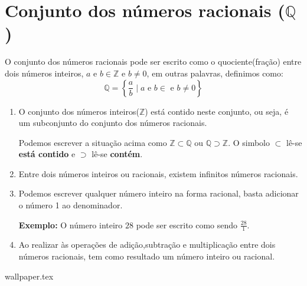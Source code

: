 \documentclass[10pt]{article}
\begin{document}
\section*{Conjunto dos números racionais (\( \mathbb{Q} \))}
O conjunto dos números racionais pode ser escrito como o quociente(fração) entre dois números inteiros, \( a \) e \(  b \in \mathbb{Z} \) e \( b \neq 0 \), em outras palavras, definimos como:
\[ \mathbb{Q} = \left\{ \frac{a}{b} \mid  a \textrm{ e } b \in \textrm{ e } b \neq 0 \right\} \]

\begin{enumerate}[label=\textbf{(\Roman*)}]
        \item O conjunto dos números inteiros(\(\mathbb{Z}\)) está contido neste conjunto, ou seja, é um subconjunto do conjunto dos números racionais.
        \begin{obs}
        Podemos escrever a situação acima como \( \mathbb{Z} \subset \mathbb{Q} \) ou \( \mathbb{Q} \supset \mathbb{Z} \). O simbolo \( \subset \) lê-se \textbf{está contido} e \( \supset \) lê-se \textbf{contém}.
        \end{obs}
        \item Entre dois números inteiros ou racionais, existem infinitos números racionais.
        \item Podemos escrever qualquer número inteiro na forma racional, basta adicionar o número 1 ao denominador.
        
        \textbf{Exemplo:} O número inteiro \( 28 \) pode ser escrito como sendo \( \frac{28}{1} \).
        \item  Ao realizar às operações de adição,subtração e multiplicação entre dois números racionais, tem como resultado um número inteiro ou racional.
\end{enumerate}
\newpage
{wallpaper.tex} %
\end{document}
